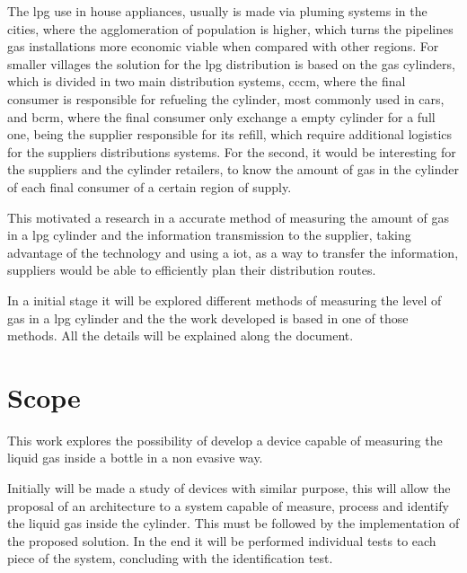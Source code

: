 The \acrshort{lpg} use in house appliances, usually is made via pluming systems in the cities, where the agglomeration of population is higher, which turns the pipelines gas installations more economic viable when compared with other regions. For smaller villages the solution for the \acrshort{lpg} distribution is based on the gas cylinders, which is divided in two main distribution systems, \acrlong{cccm}, where the final consumer is responsible for refueling the cylinder, most commonly used in cars, and \acrlong{bcrm}, where the final consumer only exchange a empty cylinder for a full one, being the supplier responsible for its refill, which require additional logistics for the suppliers distributions systems. For the second, it would be interesting for the suppliers and the cylinder retailers, to know the amount of gas in the cylinder of each final consumer of a certain region of supply.

This motivated a research in a accurate method of measuring the amount of gas in a \acrshort{lpg} cylinder and the information transmission to the supplier, taking advantage of the technology and using a \acrshort{iot}, as a way to transfer the information, suppliers would be able to efficiently plan their distribution routes. 

In a initial stage it will be explored different methods of measuring the level of gas in a \acrshort{lpg} cylinder and the the work developed is based in one of those methods. All the details will be explained along the document.

\section{Scope}
This work explores the possibility of develop a device capable of measuring the liquid gas inside a bottle in a non evasive way. 

Initially will be made a study of devices with similar purpose, this will allow the proposal of an architecture to a system capable of measure, process and identify the liquid gas inside the cylinder. This must be followed by the implementation of the proposed solution. In the end it will be performed individual tests to each piece of the system, concluding with the identification test. 

